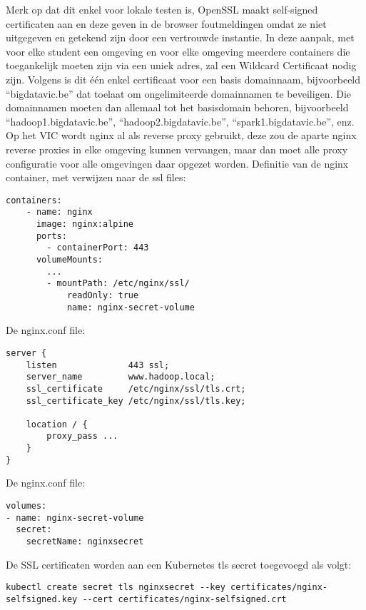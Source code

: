 Merk op dat dit enkel voor lokale testen is, OpenSSL maakt self-signed certificaten aan en deze geven in de browser foutmeldingen omdat ze niet uitgegeven en getekend zijn door een vertrouwde instantie.
\newline
In deze aanpak, met voor elke student een omgeving en voor elke omgeving meerdere containers die toegankelijk moeten zijn via een uniek adres, zal een Wildcard Certificaat nodig zijn. Volgens \textcite{Digicert2023} is dit één enkel certificaat voor een basis domainnaam, bijvoorbeeld ``bigdatavic.be'' dat toelaat om ongelimiteerde domainnamen te beveiligen. Die domainnamen moeten dan allemaal tot het basisdomain behoren, bijvoorbeeld ``hadoop1.bigdatavic.be'', ``hadoop2.bigdatavic.be'', ``spark1.bigdatavic.be'', enz.
\newline
Op het VIC wordt nginx al als reverse proxy gebruikt, deze zou de aparte nginx reverse proxies in elke omgeving kunnen vervangen, maar dan moet alle proxy configuratie voor alle omgevingen daar opgezet worden.
\newline
\newline
Definitie van de nginx container, met verwijzen naar de ssl files:
\begin{lstlisting}
containers:
    - name: nginx
      image: nginx:alpine
      ports:
        - containerPort: 443
      volumeMounts:
        ...
        - mountPath: /etc/nginx/ssl/
            readOnly: true
            name: nginx-secret-volume
\end{lstlisting}

De nginx.conf file:
\begin{lstlisting}
server {
    listen              443 ssl;
    server_name         www.hadoop.local;
    ssl_certificate     /etc/nginx/ssl/tls.crt;
    ssl_certificate_key /etc/nginx/ssl/tls.key;
    
    location / {
        proxy_pass ...
    }
}
\end{lstlisting}

De nginx.conf file:
\begin{lstlisting}
volumes:
- name: nginx-secret-volume
  secret:
    secretName: nginxsecret
\end{lstlisting}


De SSL certificaten worden aan een Kubernetes tls secret toegevoegd als volgt:
\begin{lstlisting}
kubectl create secret tls nginxsecret --key certificates/nginx-selfsigned.key --cert certificates/nginx-selfsigned.crt
\end{lstlisting}

